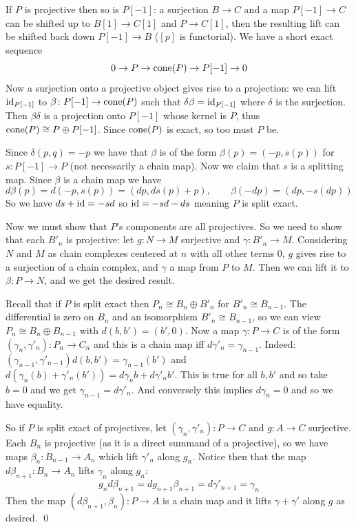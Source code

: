 \bproof

    If $P$ is projective then so is $P[-1]$: a surjection $B\to C$ and a map $P[-1]\to C$ can be shifted up to $B[1]\to C[1]$ and $P\to C[1]$, then the resulting
    lift can be shifted back down $P[-1]\to B$ ($[p]$ is functorial).
    We have a short exact sequence
    $$ 0 \to P \to {\rm cone}(P) \to P[-1] \to 0 $$
    Now a surjection onto a projective object gives rise to a projection: we can lift ${\rm id}_{P[-1]}$ to $\beta\colon P[-1]\to{\rm cone}(P)$ such that $\delta\beta={\rm id}_{P[-1]}$ where $\delta$ is the surjection.
    Then $\beta\delta$ is a projection onto $P[-1]$ whose kernel is $P$, thus ${\rm cone}(P)\cong P\oplus P[-1]$.
    Since ${\rm cone}(P)$ is exact, so too must $P$ be.

    Since $\delta(p,q)=-p$ we have that $\beta$ is of the form $\beta(p)=(-p,s(p))$ for $s\colon P[-1]\to P$ (not necessarily a chain map).
    Now we claim that $s$ is a splitting map.
    Since $\beta$ is a chain map we have
    $$ d\beta(p) = d(-p,s(p)) = (dp,ds(p)+p),\qquad \beta(-dp) = (dp,-s(dp)) $$
    So we have $ds+{\rm id}=-s d$ so ${\rm id}=-sd-ds$ meaning $P$ is split exact.

    Now we must show that $P$'s components are all projectives.
    So we need to show that each $B'_n$ is projective: let $g\colon N\to M$ surjective and $\gamma\colon B'_n\to M$.
    Considering $N$ and $M$ as chain complexes centered at $n$ with all other terms $0$, $g$ gives rise to a surjection of a chain complex, and $\gamma$ a map from $P$ to $M$.
    Then we can lift it to $\beta\colon P\to N$, and we get the desired result.

    Recall that if $P$ is split exact then $P_n\cong B_n\oplus B'_n$ for $B'_n\cong B_{n-1}$.
    The differential is zero on $B_n$ and an isomorphism $B'_n\cong B_{n-1}$, so we can view $P_n\cong B_n\oplus B_{n-1}$ with $d(b,b')=(b',0)$.
    Now a map $\gamma\colon P\to C$ is of the form $(\gamma_n,\gamma'_n)\colon P_n\to C_n$ and this is a chain map iff $d\gamma'_n=\gamma_{n-1}$.
    Indeed: $(\gamma_{n-1},\gamma'_{n-1})d(b,b')=\gamma_{n-1}(b')$ and $d(\gamma_n(b)+\gamma'_n(b'))=d\gamma_nb+d\gamma'_nb'$.
    This is true for all $b,b'$ and so take $b=0$ and we get $\gamma_{n-1}=d\gamma'_n$.
    And conversely this implies $d\gamma_n=0$ and so we have equality.

    So if $P$ is split exact of projectives, let $(\gamma_n,\gamma'_n)\colon P\to C$ and $g\colon A\to C$ surjective.
    Each $B_n$ is projective (as it is a direct summand of a projective), so we have maps $\beta_n\colon B_{n-1}\to A_n$ which lift $\gamma'_n$ along $g_n$.
    Notice then that the map $d\beta_{n+1}\colon B_n\to A_n$ lifts $\gamma_n$ along $g_n$:
    $$ g_nd\beta_{n+1} = dg_{n+1}\beta_{n+1} = d\gamma'_{n+1} = \gamma_n $$
    Then the map $(d\beta_{n+1},\beta_n)\colon P\to A$ is a chain map and it lifts $\gamma+\gamma'$ along $g$ as desired.
    \qed

